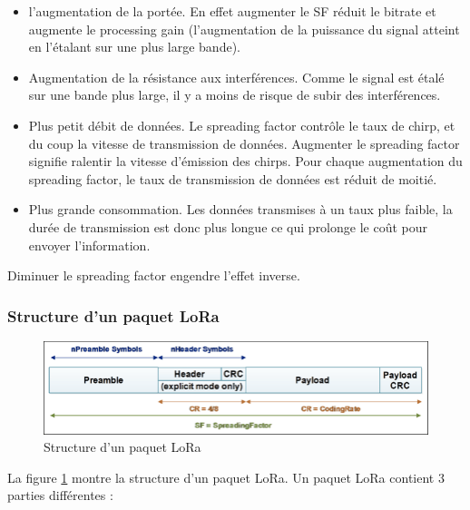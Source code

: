 \begin{itemize}
\item l'augmentation de la portée. En effet augmenter le SF réduit le bitrate et augmente le processing gain (l'augmentation de la puissance du signal atteint en l'étalant sur une plus large bande).
\item Augmentation de la résistance aux interférences. Comme le signal est étalé sur une bande plus large, il y a moins de risque de subir des interférences.
\item Plus petit débit de données. Le spreading factor contrôle le taux de chirp, et du coup la vitesse de transmission de données. Augmenter le spreading factor signifie ralentir la vitesse d'émission des chirps. Pour chaque augmentation du spreading factor, le taux de transmission de données est réduit de moitié.
\item Plus grande consommation. Les données transmises à un taux plus faible, la durée de transmission est donc plus longue ce qui prolonge le coût pour envoyer l'information.
\end{itemize}

Diminuer le spreading factor engendre l'effet inverse.


\subsubsection{Structure d'un paquet LoRa}\label{packetlora}

\begin{figure}[h]
\centering

\includegraphics[scale=0.4]{images/lorapacket.png}
\caption{Structure d'un paquet LoRa\cite{lorapacket}}\label{term6}
\end{figure}


La figure \ref{term6} montre la structure d'un paquet \ac{LoRa}. Un paquet \ac{LoRa} contient 3 parties différentes \cite{loraphy} :

\vspace{0.1cm}

